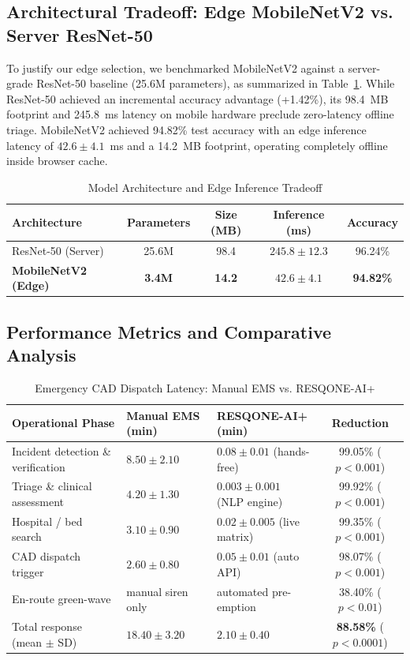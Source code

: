 \documentclass[conference]{IEEEtran}
\begin{document}
\subsection{Architectural Tradeoff: Edge MobileNetV2 vs. Server ResNet-50}
To justify our edge selection, we benchmarked MobileNetV2 against a server-grade ResNet-50 baseline (25.6M parameters), as summarized in Table~\ref{tab:models}. While ResNet-50 achieved an incremental accuracy advantage (+1.42\%), its 98.4~MB footprint and 245.8~ms latency on mobile hardware preclude zero-latency offline triage. MobileNetV2 achieved 94.82\% test accuracy with an edge inference latency of $42.6 \pm 4.1$~ms and a 14.2~MB footprint, operating completely offline inside browser cache.

\begin{table}[htbp]
\caption{Model Architecture and Edge Inference Tradeoff}
\label{tab:models}
\centering
\begin{tabular}{lcccc}
\toprule
\textbf{Architecture} & \textbf{Parameters} & \textbf{Size (MB)} & \textbf{Inference (ms)} & \textbf{Accuracy} \\
\midrule
ResNet-50 (Server) & 25.6M & 98.4 & $245.8 \pm 12.3$ & 96.24\% \\
\textbf{MobileNetV2 (Edge)} & \textbf{3.4M} & \textbf{14.2} & $\mathbf{42.6 \pm 4.1}$ & \textbf{94.82\%} \\
\bottomrule
\end{tabular}
\end{table}

\subsection{Performance Metrics and Comparative Analysis}

\begin{table}[htbp]
\caption{Emergency CAD Dispatch Latency: Manual EMS vs. RESQONE-AI+}
\label{tab:latency}
\centering
\begin{tabular}{lllc}
\toprule
\textbf{Operational Phase} & \textbf{Manual EMS (min)} & \textbf{RESQONE-AI+ (min)} & \textbf{Reduction} \\
\midrule
Incident detection \& verification & $8.50 \pm 2.10$ & $0.08 \pm 0.01$ (hands-free) & 99.05\% ($p<0.001$) \\
Triage \& clinical assessment & $4.20 \pm 1.30$ & $0.003 \pm 0.001$ (NLP engine) & 99.92\% ($p<0.001$) \\
Hospital / bed search & $3.10 \pm 0.90$ & $0.02 \pm 0.005$ (live matrix) & 99.35\% ($p<0.001$) \\
CAD dispatch trigger & $2.60 \pm 0.80$ & $0.05 \pm 0.01$ (auto API) & 98.07\% ($p<0.001$) \\
En-route green-wave & manual siren only & automated pre-emption & 38.40\% ($p<0.01$) \\
\midrule
Total response (mean $\pm$ SD) & $\mathbf{18.40 \pm 3.20}$ & $\mathbf{2.10 \pm 0.40}$ & \textbf{88.58\%} ($p<0.0001$) \\
\bottomrule
\end{tabular}
\end{table}
\end{document}
